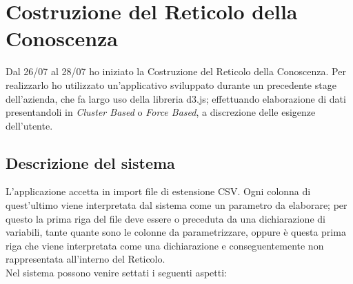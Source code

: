 \section{Costruzione del Reticolo della Conoscenza}
\label{Costruzione del Reticolo della Conoscenza}
Dal 26/07  al 28/07 ho iniziato la Costruzione del Reticolo della Conoscenza. Per realizzarlo ho utilizzato un'applicativo sviluppato durante un precedente stage dell'azienda, che fa largo uso della libreria d3.js; effettuando elaborazione di dati presentandoli in \textit{Cluster Based} o \textit{Force Based}, a discrezione delle esigenze dell'utente.

\subsection{Descrizione del sistema}
\label{Descrizione del sistema}
L'applicazione accetta in import file di estensione CSV. Ogni colonna di quest'ultimo viene interpretata dal sistema come un parametro da elaborare; per questo la prima riga del file deve essere o preceduta da una dichiarazione di variabili, tante quante sono le colonne da parametrizzare, oppure \`e questa prima riga che viene interpretata come una dichiarazione e conseguentemente non rappresentata all'interno del Reticolo.\\
Nel sistema possono venire settati i seguenti aspetti:

